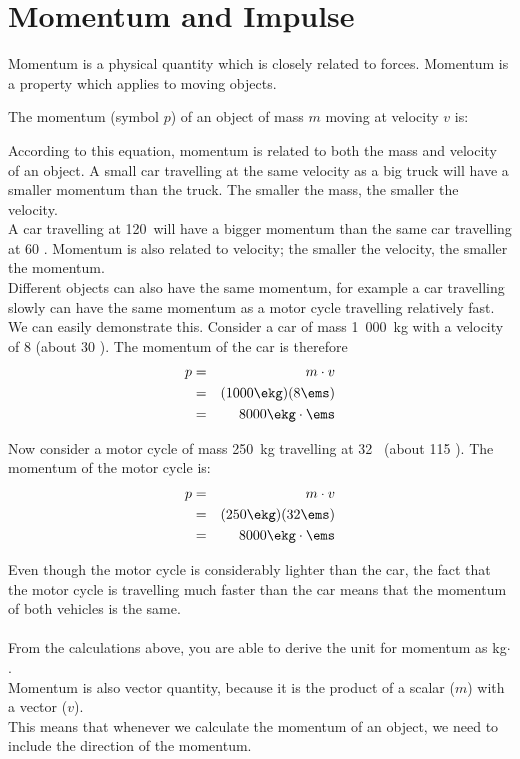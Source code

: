 \section{Momentum and Impulse}

Momentum is a physical quantity which is closely related to forces. Momentum is a property which applies to moving objects.


The momentum (symbol $p$) of an object of mass $m$ moving at velocity $v$ is:

According to this equation, momentum is related to both the mass and velocity of an object. A small car travelling at the same velocity as a big truck will have a smaller momentum than the truck. The smaller the mass, the smaller the velocity.\\
 A car travelling at 120~\kph will have a bigger momentum than the same car travelling at 60 \kph. Momentum is also related to velocity; the smaller the velocity, the smaller the momentum.\\
Different objects can also have the same momentum, for example a car travelling slowly can have the same momentum as a motor cycle travelling relatively fast. We can easily demonstrate this. Consider a car of mass 1~000~kg with a velocity of 8 \ms (about 30 \kph). The momentum of the car is therefore
\begin{eqnarray*}
p&=&m \cdot v\\
&=& (1000 \ekg)(8 \ems)\\
&=& 8000 \ekg\cdot\ems
\end{eqnarray*}

Now consider a motor cycle of mass 250~kg travelling at 32 \ms\ (about 115 \kph). The momentum of the motor cycle is:
\begin{eqnarray*}
p&=&m \cdot v\\
&=& (250 \ekg)(32 \ems)\\
&=& 8000 \ekg \cdot \ems
\end{eqnarray*}

Even though the motor cycle is considerably lighter than the car, the fact that the motor cycle is travelling much faster than the car means that the momentum of both vehicles is the same.\\
\\
From the calculations above, you are able to derive the unit for momentum as kg$\cdot$\ms.\\
Momentum is also vector quantity, because it is the product of a scalar ($m$) with a vector ($v$).\\This means that whenever we calculate the momentum of an object, we need to include the direction of the momentum.

